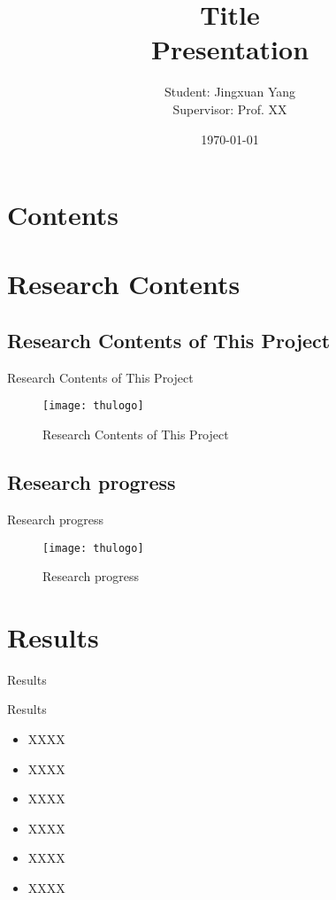 \documentclass{beamer}
\title[Title]{Title\\[2mm] Presentation}
\author[Jingxuan Yang]{Student: Jingxuan Yang\\[5mm] Supervisor: Prof. XX}
\institute[Tsinghua University]{\small Tsinghua University}
\date{\small \vskip -10pt \today}
\begin{document}
\begin{frame}
	\maketitle
\end{frame}

\section*{Contents}
\frame{
  \frametitle{\secname}
  \tableofcontents[hideallsubsections]
}

\section{Research Contents}

\subsection{Research Contents of This Project}

\begin{frame}{Research Contents of This Project}
  \begin{figure}
    \texttt{[image: thulogo]}
    \caption{Research Contents of This Project}
  \end{figure}
\end{frame}

\subsection{Research progress}

\begin{frame}{Research progress}
  \begin{figure}
    \texttt{[image: thulogo]}
    \caption{Research progress}
  \end{figure}
\end{frame}

\section{Results}

\begin{frame}{Results}
  \begin{block}{Results}
    \begin{itemize}
      \setlength{\itemsep}{6pt}
      \item XXXX
      \item XXXX
      \item XXXX
      \item XXXX
      \item XXXX
      \item XXXX
    \end{itemize}
  \end{block}
\end{frame}
\end{document}
